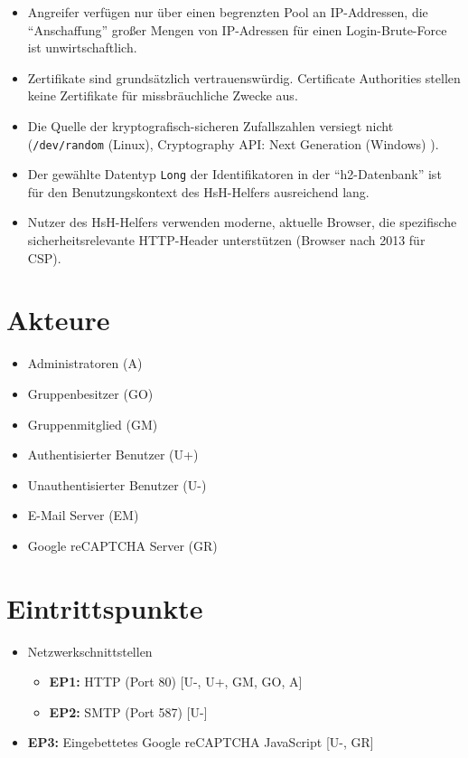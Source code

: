 \documentclass[fontsize=12pt,DIV=14,BCOR=10mm,a4paper,parskip=half-,english,ngerman,bibliography=totocnumbered]{scrreprt}
\begin{document}
\begin{itemize}
  \item Angreifer verfügen nur über einen begrenzten Pool an IP-Addressen, die \enquote{Anschaffung} großer Mengen von IP-Adressen für einen Login-Brute-Force ist unwirtschaftlich.
  \item Zertifikate sind grundsätzlich vertrauenswürdig. Certificate Authorities stellen keine Zertifikate für missbräuchliche Zwecke aus.
  \item Die Quelle der kryptografisch-sicheren Zufallszahlen versiegt nicht (\texttt{/dev/random} (Linux), Cryptography API: Next Generation (Windows) \autocite{Windows.SecureRandom}).
  \item Der gewählte Datentyp \texttt{Long} der Identifikatoren in der \enquote{h2-Datenbank} ist für den Benutzungskontext des HsH-Helfers ausreichend lang.
  \item Nutzer des HsH-Helfers verwenden moderne, aktuelle Browser, die spezifische sicherheitsrelevante HTTP-Header unterstützen (Browser nach 2013 für CSP).
\end{itemize}

\chapter{Akteure}

\begin{itemize}
  \item Administratoren (A)
  \item Gruppenbesitzer (GO)
  \item Gruppenmitglied (GM)
  \item Authentisierter Benutzer (U+)
  \item Unauthentisierter Benutzer (U-)
  \item E-Mail Server (EM)
  \item Google reCAPTCHA Server (GR)
\end{itemize}

\chapter{Eintrittspunkte}

\begin{itemize}
  \item Netzwerkschnittstellen
  \begin{itemize}
    \item \textbf{EP1:} HTTP (Port 80)  [U-, U+, GM, GO, A]
    \item \textbf{EP2:} SMTP (Port 587) [U-]
  \end{itemize}
  \item \textbf{EP3:} Eingebettetes Google reCAPTCHA JavaScript [U-, GR]
\end{itemize}
\end{document}
